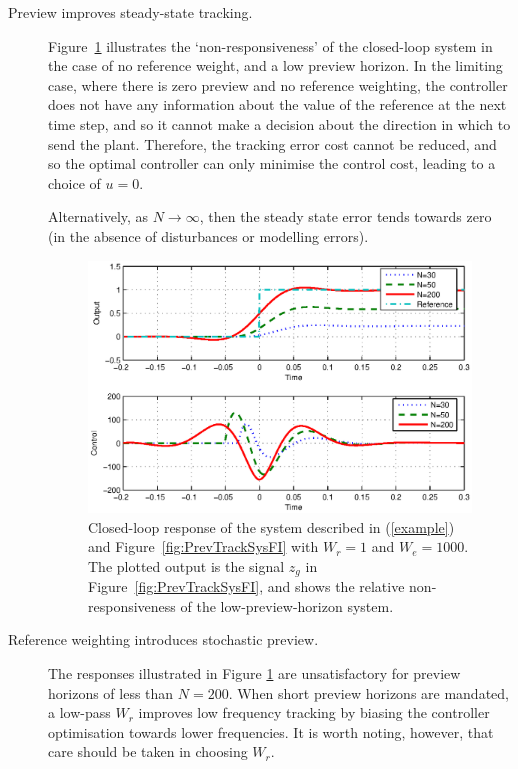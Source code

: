 \begin{description}
\item[Preview improves steady-state tracking.] 
Figure~\ref{fig:BetterSSWithIncN} illustrates the `non-responsiveness' of the closed-loop system in the case of no reference weight, and a low preview horizon. In the limiting case, where there is zero preview and no reference weighting, the controller does not have any information about the value of the reference at the next time step, and so it cannot make a decision about the direction in which to send the plant. Therefore, the tracking error cost cannot be reduced, and so the optimal controller can only minimise the control cost, leading to a choice of $u=0$.

Alternatively, as $N\rightarrow \infty$, then the steady state error tends towards zero (in the absence of disturbances or modelling errors). 
\begin{figure}
\includegraphics[width=\columnwidth]{./diags/BetterSSwithIncN.eps}
\caption{Closed-loop response of the system described in (\ref{example}) and Figure~\ref{fig:PrevTrackSysFI} with $W_r=1$ and $W_e=1000$.
The plotted output is the signal $z_g$ in Figure~\ref{fig:PrevTrackSysFI}, and shows the relative non-responsiveness of the low-preview-horizon system.
\label{fig:BetterSSWithIncN}}
\end{figure}
\item[Reference weighting introduces stochastic preview.] 
The responses illustrated in Figure \ref{fig:BetterSSWithIncN} are unsatisfactory for preview horizons of less than $N=200$. When short preview horizons are mandated, a low-pass $W_r$ improves low frequency tracking by biasing the controller optimisation towards lower frequencies. It is worth noting, however, that care should be taken in choosing $W_r$.

\end{description}
